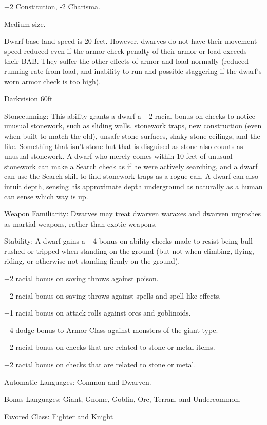 

\begin{itemize*}
\item +2 Constitution, -2 Charisma.
\item Medium size.
\item Dwarf base land speed is 20 feet. However, dwarves do not have their movement speed reduced even if the armor check penalty of their armor or load exceeds their BAB. They suffer the other effects of armor and load normally (reduced running rate from load, and inability to run and possible staggering if the dwarf's worn armor check is too high).
\item Darkvision 60ft
\item Stonecunning: This ability grants a dwarf a +2 racial bonus on  checks to notice unusual stonework, such as sliding walls, stonework traps, new construction (even when built to match the old), unsafe stone surfaces, shaky stone ceilings, and the like. Something that isn't stone but that is disguised as stone also counts as unusual stonework. A dwarf who merely comes within 10 feet of unusual stonework can make a Search check as if he were actively searching, and a dwarf can use the Search skill to find stonework traps as a rogue can. A dwarf can also intuit depth, sensing his approximate depth underground as naturally as a human can sense which way is up.
\item Weapon Familiarity: Dwarves may treat dwarven waraxes and dwarven urgroshes as martial weapons, rather than exotic weapons.
\item Stability: A dwarf gains a +4 bonus on ability checks made to resist being bull rushed or tripped when standing on the ground (but not when climbing, flying, riding, or otherwise not standing firmly on the ground).
\item +2 racial bonus on saving throws against poison.
\item +2 racial bonus on saving throws against spells and spell-like effects.
\item +1 racial bonus on attack rolls against orcs and goblinoids.
\item +4 dodge bonus to Armor Class against monsters of the giant type.
\item +2 racial bonus on  checks that are related to stone or metal items.
\item +2 racial bonus on  checks that are related to stone or metal.
\item Automatic Languages: Common and Dwarven.
\item Bonus Languages: Giant, Gnome, Goblin, Orc, Terran, and Undercommon.
\item Favored Class: Fighter and Knight
\end{itemize*}
